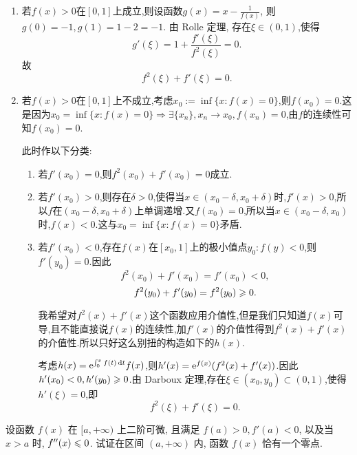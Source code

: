 \begin{solution}

    \begin{enumerate}
        \item 若$f(x) > 0$在$[0,1]$上成立,则设函数$g(x) = x - \frac{1}{f(x)}$, 则$g(0) = -1, g(1) = 1 - 2 = -1$. 由 Rolle 定理, 存在$\xi \in (0,1)$,使得
              $$g'(\xi) = 1 + \frac{f'(\xi)}{f^2(\xi)} = 0.$$
              故
              $$f^2(\xi) + f'(\xi) = 0.$$
        \item 若$f(x) > 0 $在$[0,1]$上不成立,考虑$x_0:=\inf\{x:f(x)=0\}$,则$f(x_0) = 0$.这是因为$x_0 = \inf\{x:f(x)=0\} \Rightarrow \exists \{x_n\},x_n \to x_0,f(x_n) = 0$,由$f$的连续性可知$f(x_0) = 0$.

              此时作以下分类:
              \begin{enumerate}
                  \item 若$f'(x_0) = 0$,则$f^2(x_0) + f'(x_0) = 0$成立.
                  \item 若$f'(x_0) > 0 $,则存在$\delta > 0$,使得当$x \in (x_0 - \delta, x_0 + \delta)$时,$f'(x) > 0$,所以$f$在$(x_0 - \delta, x_0 + \delta)$上单调递增.又$f(x_0) = 0$,所以当$x \in (x_0 - \delta, x_0)$时,$f(x) < 0$.这与$x_0 = \inf\{x:f(x)=0\}$矛盾.
                  \item 若$f'(x_0) < 0 $,存在$f(x)$在$[x_0,1]$上的极小值点$y_0:f(y)<0$,则$f'(y_0) = 0$.因此
                        $$f^2(x_0) + f'(x_0) = f'(x_0) < 0,$$
                        $$f^2(y_0) + f'(y_0) = f^2(y_0) \geqslant 0.$$
                        \begin{remark}
                            我希望对$f^2(x) + f'(x)$这个函数应用介值性,但是我们只知道$f(x)$可导,且不能直接说$f(x)$的连续性,加$f'(x)$的介值性得到$f^2(x) + f'(x)$的介值性.所以只好这么别扭的构造如下的$h(x)$.
                        \end{remark}

                        考虑$h(x) = \mathrm{e}^{\int_0^x f(t) \operatorname{d\!} t}f(x)$,则$h'(x) = \mathrm{e}^{f(x)}(f^2(x) + f'(x))$.因此$h'(x_0) < 0,h'(y_0) \geqslant 0$.由 Darboux 定理,存在$\xi \in (x_0,y_0) \subset (0,1)$,使得$h'(\xi) = 0$,即
                        $$f^2(\xi) + f'(\xi) = 0.$$
              \end{enumerate}
    \end{enumerate}
\end{solution}

\begin{exercise}[3.C.9]
    设函数 $f(x)$ 在 $[a, +\infty)$ 上二阶可微, 且满足 $f(a) > 0, f'(a) < 0$, 以及当 $x > a$ 时, $f''(x) \leqslant 0$. 试证在区间 $(a, +\infty)$ 内, 函数 $f(x)$ 恰有一个零点.
\end{exercise}

